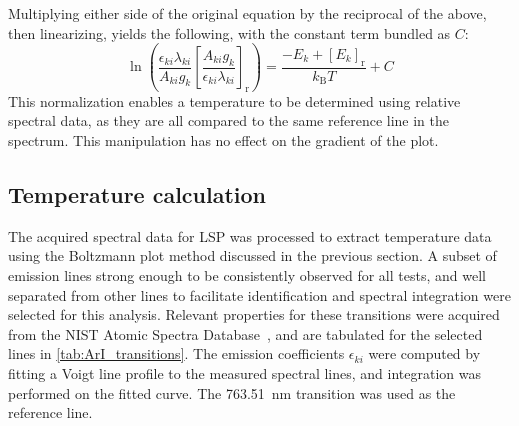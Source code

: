             Multiplying either side of the original equation by the reciprocal of the above, then linearizing, yields the following, with the constant term bundled as $C$:
            \begin{equation}
                \ln{\left(\frac{\epsilon_{ki}\lambda_{ki}}{A_{ki}g_k}\left[\frac{A_{ki}g_k}{\epsilon_{ki}\lambda_{ki}}\right]_\mathrm{r}\right)} = \frac{-E_k+[E_k]_\mathrm{r}}{k_\mathrm{B}T} + C
            \end{equation}
            This normalization enables a temperature to be determined using relative spectral data, as they are all compared to the same reference line in the spectrum. This manipulation has no effect on the gradient of the plot.

        \subsection{Temperature calculation}
            The acquired spectral data for LSP was processed to extract temperature data using the Boltzmann plot method discussed in the previous section. A subset of emission lines strong enough to be consistently observed for all tests, and well separated from other lines to facilitate identification and spectral integration were selected for this analysis. Relevant properties for these transitions were acquired from the NIST Atomic Spectra Database~\cite{kramidaNISTAtomicSpectra2022}, and are tabulated for the selected lines in \autoref{tab:ArI_transitions}. The emission coefficients $\epsilon_{ki}$ were computed by fitting a Voigt line profile to the measured spectral lines, and integration was performed on the fitted curve. The \qty{763.51}{nm} transition was used as the reference line.

